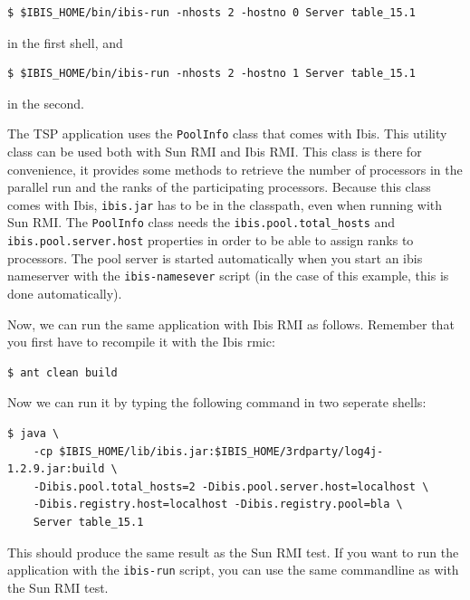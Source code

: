 \documentclass[10pt]{article}
\begin{document}
\noindent
{\small
\begin{verbatim}
$ $IBIS_HOME/bin/ibis-run -nhosts 2 -hostno 0 Server table_15.1
\end{verbatim}
}

\noindent
in the first shell, and

\noindent
{\small
\begin{verbatim}
$ $IBIS_HOME/bin/ibis-run -nhosts 2 -hostno 1 Server table_15.1
\end{verbatim}
}

\noindent in the second.

The TSP application uses the \texttt{PoolInfo}
class that comes with Ibis. This utility class can be used both with
Sun RMI and Ibis RMI. This class is there for convenience, it provides
some methods to retrieve the number of processors in the parallel run
and the ranks of the participating processors. Because this class
comes with Ibis, \texttt{ibis.jar} has to be in the classpath, even
when running with Sun RMI.  The \texttt{PoolInfo} class needs the
\texttt{ibis.pool.total\_hosts} and \texttt{ibis.pool.server.host}
properties in order to be able to assign ranks to processors. The
pool server is started automatically when you start an ibis nameserver
with the \texttt{ibis-namesever} script (in the case of this example, this is done automatically).

Now, we can run the same application with Ibis RMI as follows.
Remember that you first have to recompile it with the Ibis rmic:

\noindent
{\small
\begin{verbatim}
$ ant clean build
\end{verbatim}
}
\noindent
Now we can run it by typing the following command in two seperate shells:

\noindent
{\small
\begin{verbatim}
$ java \
    -cp $IBIS_HOME/lib/ibis.jar:$IBIS_HOME/3rdparty/log4j-1.2.9.jar:build \
    -Dibis.pool.total_hosts=2 -Dibis.pool.server.host=localhost \
    -Dibis.registry.host=localhost -Dibis.registry.pool=bla \
    Server table_15.1 
\end{verbatim}
}
\noindent

This should produce the same result as the Sun RMI test.
If you want to run the application with the \texttt{ibis-run} script,
you can use the same commandline as with the Sun RMI test.
\end{document}
